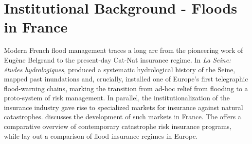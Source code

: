 

\chapter{Institutional Background - Floods in France}
\label{ch: Background}

Modern French flood management traces a long arc from the pioneering work of Eugène Belgrand to the present‐day Cat-Nat insurance regime. In \emph{La Seine: études hydrologiques}, \cite{Belgrand1872} produced a systematic hydrological history of the Seine, mapped past inundations and, crucially, installed one of Europe’s first telegraphic flood-warning chains, marking the transition from ad-hoc relief from flooding to a proto-system of risk management. In parallel, the institutionalization of the insurance industry gave rise to specialized markets for insurance against natural catastrophes. \cite{grislain2018natural} discusses the development of such markets in France. The \cite{OECD2021} offers a comparative overview of contemporary catastrophe risk insurance programs, while \cite{bock2024flood} lay out a comparison of flood insurance regimes in Europe. %

